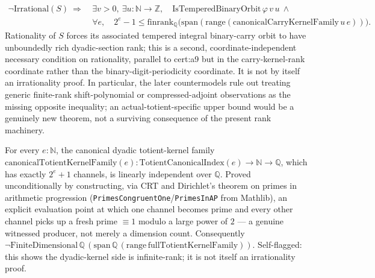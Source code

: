 \begin{thm}
\[
\begin{aligned}
\neg\mathrm{Irrational}(S) \ \Longrightarrow\ {}
  &\exists v>0,\ \exists u:\mathbb{N}\to\mathbb{Z},\quad
    \mathrm{IsTemperedBinaryOrbit}\,\varphi\,v\,u \ \wedge \\
  &\forall e,\quad 2^e-1 \le
    \mathrm{finrank}_{\mathbb{Q}}
      \bigl(\mathrm{span}(\mathrm{range}(\mathrm{canonicalCarryKernelFamily}\,u\,e))\bigr).
\end{aligned}
\]
Rationality of $S$ forces its associated tempered integral binary-carry orbit to have unboundedly rich dyadic-section rank; this is a second, coordinate-independent necessary condition on rationality, parallel to cert:a9 but in the carry-kernel-rank coordinate rather than the binary-digit-periodicity coordinate. It is not by itself an irrationality proof. In particular, the later countermodels rule out treating generic finite-rank shift-polynomial or compressed-adjoint observations as the missing opposite inequality; an actual-totient-specific upper bound would be a genuinely new theorem, not a surviving consequence of the present rank machinery.
\par\noindent{}   
\end{thm}

\begin{thm}
For every $e:\mathbb{N}$, the canonical dyadic totient-kernel family $\mathrm{canonicalTotientKernelFamily}(e) : \mathrm{TotientCanonicalIndex}(e) \to \mathbb{N}\to\mathbb{Q}$, which has exactly $2^e+1$ channels, is linearly independent over $\mathbb{Q}$. Proved unconditionally by constructing, via CRT and Dirichlet's theorem on primes in arithmetic progression (\texttt{PrimesCongruentOne}/\texttt{PrimesInAP} from Mathlib), an explicit evaluation point at which one channel becomes prime and every other channel picks up a fresh prime $\equiv 1$ modulo a large power of $2$ — a genuine witnessed producer, not merely a dimension count. Consequently $\neg\mathrm{FiniteDimensional}\,\mathbb{Q}\,(\mathrm{span}\,\mathbb{Q}\,(\mathrm{range}\,\mathrm{fullTotientKernelFamily}))$. Self-flagged: this shows the dyadic-kernel side is infinite-rank; it is not itself an irrationality proof.
\par\noindent{}    
\end{thm}

